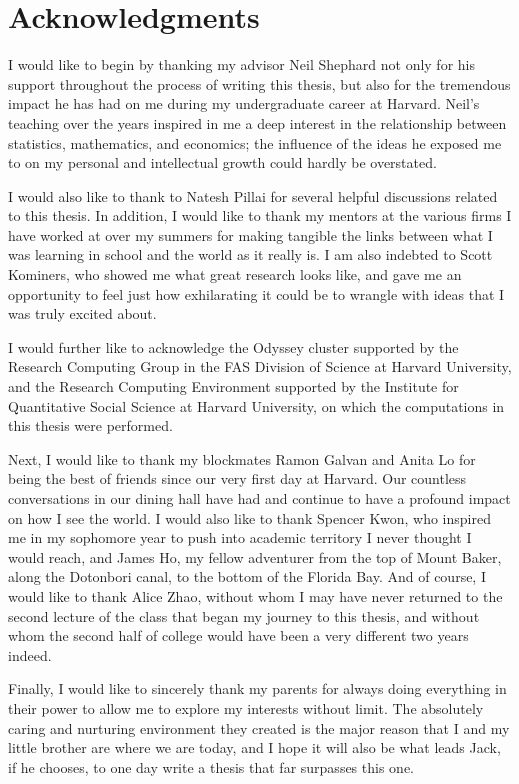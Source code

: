 \begingroup
\let\clearpage\relax
\let\cleardoublepage\relax 


\chapter*{Acknowledgments}

I would like to begin by thanking my advisor Neil Shephard not only
for his support throughout the process of writing this thesis, but
also for the tremendous impact he has had on me during my undergraduate
career at Harvard. Neil's teaching over the years inspired in me a
deep interest in the relationship between statistics, mathematics,
and economics; the influence of the ideas he exposed me to on my personal
and intellectual growth could hardly be overstated.

I would also like to thank to Natesh Pillai for several helpful discussions
related to this thesis. In addition, I would like to thank my mentors
at the various firms I have worked at over my summers for making tangible
the links between what I was learning in school and the world as it
really is. I am also indebted to Scott Kominers, who showed me what
great research looks like, and gave me an opportunity to feel just
how exhilarating it could be to wrangle with ideas that I was truly
excited about.

I would further like to acknowledge the Odyssey cluster supported
by the Research Computing Group in the FAS Division of Science at
Harvard University, and the Research Computing Environment supported
by the Institute for Quantitative Social Science at Harvard University,
on which the computations in this thesis were performed.

Next, I would like to thank my blockmates Ramon Galvan and Anita Lo
for being the best of friends since our very first day at Harvard.
Our countless conversations in our dining hall have had and continue
to have a profound impact on how I see the world. I would also like
to thank Spencer Kwon, who inspired me in my sophomore year to push
into academic territory I never thought I would reach, and James Ho,
my fellow adventurer from the top of Mount Baker, along the Dotonbori
canal, to the bottom of the Florida Bay. And of course, I would like
to thank Alice Zhao, without whom I may have never returned to the
second lecture of the class that began my journey to this thesis,
and without whom the second half of college would have been a very
different two years indeed.

Finally, I would like to sincerely thank my parents for always doing
everything in their power to allow me to explore my interests without
limit. The absolutely caring and nurturing environment they created
is the major reason that I and my little brother are where we are
today, and I hope it will also be what leads Jack, if he chooses,
to one day write a thesis that far surpasses this one. 

\endgroup
